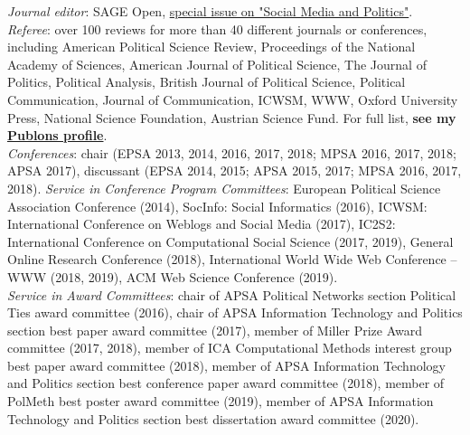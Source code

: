 \documentclass[margin,line,11pt]{resume}
\newcommand{\nl}{\vspace{0.10in}\\}
\begin{document}
\begin{resume}
\emph{Journal editor}: SAGE Open, \href{https://journals.sagepub.com/topic/sgo-subjects/3468/sgo}{special issue on "Social Media and Politics"}.\nl
\emph{Referee}: over 100 reviews for more than 40 different journals or conferences, including American Political Science Review, Proceedings of the National Academy of Sciences, American Journal of Political Science, The Journal of Politics, Political Analysis, British Journal of Political Science, Political Communication, Journal of Communication, ICWSM, WWW, Oxford University Press, National Science Foundation, Austrian Science Fund. For full list, \textbf{see my \href{https://publons.com/author/1291880/pablo-barbera}{Publons profile}}.\nl
\emph{Conferences}: chair (EPSA 2013, 2014, 2016, 2017, 2018; MPSA 2016, 2017, 2018; APSA 2017), discussant (EPSA 2014, 2015; APSA 2015, 2017; MPSA 2016, 2017, 2018).
\newpage
\emph{Service in Conference Program Committees}: European Political Science Association Conference (2014), SocInfo: Social Informatics (2016), ICWSM: International Conference on Weblogs and Social Media (2017), IC2S2: International Conference on Computational Social Science (2017, 2019), General Online Research Conference (2018),  International World Wide Web Conference -- WWW (2018, 2019), ACM Web Science Conference (2019).\nl
\emph{Service in Award Committees}: chair of APSA Political Networks section Political Ties award committee (2016), chair of APSA Information Technology and Politics section best paper award committee (2017), member of Miller Prize Award committee (2017, 2018), member of ICA Computational Methods interest group best paper award committee (2018), member of APSA Information Technology and Politics section best conference paper award committee (2018), member of PolMeth best poster award committee (2019), member of APSA Information Technology and Politics section best dissertation award committee (2020).


\end{resume}
\end{document}

